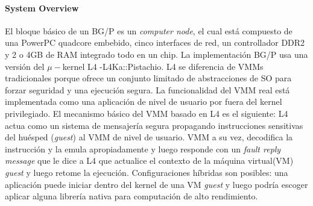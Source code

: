 \paragraph{\textnormal{\textbf{System Overview}}}
El bloque básico de un BG/P es un \emph{computer node}, el cual está compuesto de una PowerPC quadcore embebido, cinco interfaces de red, un controllador DDR2 y 2 o 4GB de RAM integrado todo en un chip. La implementación BG/P usa una versión del $\mu-$kernel L4 -L4Ka::Pistachio. L4 se diferencia de VMMs tradicionales porque ofrece un conjunto limitado de abstracciones de SO para forzar seguridad y una ejecución segura. La funcionalidad del VMM real está implementada como una aplicación de nivel de usuario por fuera del kernel privilegiado. El mecanismo básico del VMM basado en L4 es el siguiente: L4 actua como un sistema de mensajería segura propagando instrucciones sensitivas del huésped (\emph{guest}) al VMM de nivel de usuario. VMM a su vez, decodifica la instrucción y la emula apropiadamente y luego responde con un \emph{fault reply message} que le dice a L4 que actualice el contexto de la máquina virtual(VM) \emph{guest} y luego retome la ejecución. Configuraciones híbridas son posibles: una aplicación puede iniciar dentro del kernel de una VM \emph{guest} y luego podría escoger aplicar alguna librería nativa para computación de alto rendimiento.

